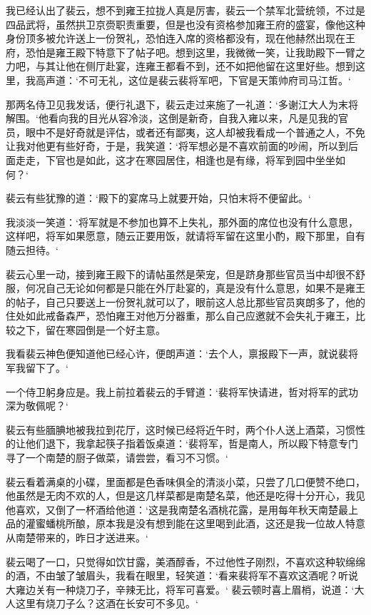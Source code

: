 我已经认出了裴云，想不到雍王拉拢人真是厉害，裴云一个禁军北营统领，不过是四品武将，虽然拱卫京赍职责重要，但是也没有资格参加雍王府的盛宴，像他这种身份顶多被允许送上一份贺礼，恐怕连入席的资格都没有，现在他赫然出现在王府，恐怕是雍王殿下特意下了帖子吧。想到这里，我微微一笑，让我助殿下一臂之力吧，与其让他在侧厅赴宴，连雍王都看不到，还不如把他留在这里好些。想到这里，我高声道：‘不可无礼，这位是裴云裴将军吧，下官是天策帅府司马江哲。‘

那两名侍卫见我发话，便行礼退下，裴云走过来施了一礼道：‘多谢江大人为末将解围。‘他看向我的目光从容冷淡，这倒是新奇，自我入雍以来，凡是见我的官员，眼中不是好奇就是评估，或者还有鄙夷，这人却被我看成一个普通之人，不免让我对他更有些好奇，于是，我笑道：‘将军想必是不喜欢前面的吵闹，所以到后面走走，下官也是如此，这才在寒园居住，相逢也是有缘，将军到园中坐坐如何？‘

裴云有些犹豫的道：‘殿下的宴席马上就要开始，只怕末将不便留此。‘

我淡淡一笑道：‘将军就是不参加也算不上失礼，那外面的席位也没有什么意思，这样吧，将军如果愿意，随云正要用饭，就请将军留在这里小酌，殿下那里，自有随云担待。‘

裴云心里一动，接到雍王殿下的请帖虽然是荣宠，但是跻身那些官员当中却很不舒服，何况自己无论如何都是只能在外厅赴宴的，真是没有什么意思，如果不是雍王的帖子，自己只要送上一份贺礼就可以了，眼前这人总比那些官员爽朗多了，他的住处如此戒备森严，恐怕雍王对他万分器重，那么自己应邀就不会失礼于雍王，比较之下，留在寒园倒是一个好主意。

我看裴云神色便知道他已经心许，便朗声道：‘去个人，禀报殿下一声，就说裴将军我留下了。‘

一个侍卫躬身应是。我上前拉着裴云的手臂道：‘裴将军快请进，哲对将军的武功深为敬佩呢？‘

裴云有些腼腆地被我拉到花厅，这时候已经将近午时，两个仆人送上酒菜，习惯性的让他们退下，我拿起筷子指着饭桌道：‘裴将军，哲是南人，所以殿下特意专门寻了一个南楚的厨子做菜，请尝尝，看习不习惯。‘

裴云看着满桌的小碟，里面都是色香味俱全的清淡小菜，只尝了几口便赞不绝口，他虽然是无肉不欢的人，但是这几样菜都是南楚名菜，他还是吃得十分开心，我见他喜欢，又倒了一杯酒给他道：‘这是我南楚名酒桃花露，是用每年秋天南楚最上品的灌蜜蟠桃所酿，原本我是没有想到能在这里喝到此酒，这还是我一位故人特意从南楚带来的，昨日才送进来。‘

裴云喝了一口，只觉得如饮甘露，美酒醇香，不过他性子刚烈，不喜欢这种软绵绵的酒，不由皱了皱眉头，我看在眼里，轻笑道：‘看来裴将军不喜欢这酒呢？听说大雍边关有一种烧刀子，辛辣无比，将军可喜爱。‘ 裴云顿时喜上眉梢，说道：‘大人这里有烧刀子么？这酒在长安可不多见。‘

